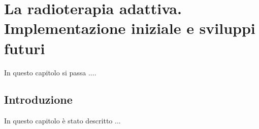 \chapter{La radioterapia adattiva. Implementazione iniziale e sviluppi futuri}
\minitoc
\textsf{In questo capitolo si passa ....}



\section{Introduzione}
In questo capitolo è stato descritto ... 












